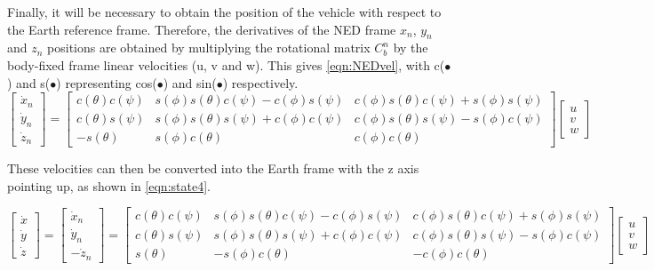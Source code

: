 Finally, it will be necessary to obtain the position of the vehicle with respect to the Earth reference frame. Therefore, the derivatives of the NED frame $x_{n}$, $y_{n}$ and $z_{n}$ positions are obtained by multiplying the rotational matrix $C^{n}_{b}$ by the body-fixed frame linear velocities (u, v and w). This gives \eqref{eqn:NEDvel}, with c($\bullet$) and s($\bullet$) representing cos($\bullet$) and sin($\bullet$) respectively. 
\begin{equation}\label{eqn:NEDvel}
\begin{bmatrix}
\dot{x}_{n}\\\dot{y}_{n}\\\dot{z}_{n}
\end{bmatrix}
=
\begin{bmatrix}
c(\theta)c(\psi) & s(\phi)s(\theta)c(\psi)-c(\phi)s(\psi) & c(\phi)s(\theta)c(\psi)+s(\phi)s(\psi)\\
c(\theta)s(\psi) & s(\phi)s(\theta)s(\psi)+c(\phi)c(\psi) & c(\phi)s(\theta)s(\psi)-s(\phi)c(\psi)\\
-s(\theta) & s(\phi)c(\theta) & c(\phi)c(\theta)
\end{bmatrix}
\begin{bmatrix}
u\\v\\w
\end{bmatrix}
\end{equation}

These velocities can then be converted into the Earth frame with the z axis pointing up, as shown in \eqref{eqn:state4}.
\begin{small}
\begin{equation}\label{eqn:state4}
\begin{bmatrix}
\dot{x}\\\dot{y}\\\dot{z}
\end{bmatrix}
=
\begin{bmatrix}
\dot{x}_{n}\\\dot{y}_{n}\\-\dot{z}_{n}
\end{bmatrix}
=
\begin{bmatrix}
c(\theta)c(\psi) & s(\phi)s(\theta)c(\psi)-c(\phi)s(\psi) & c(\phi)s(\theta)c(\psi)+s(\phi)s(\psi)\\
c(\theta)s(\psi) & s(\phi)s(\theta)s(\psi)+c(\phi)c(\psi) & c(\phi)s(\theta)s(\psi)-s(\phi)c(\psi)\\
s(\theta) & -s(\phi)c(\theta) & -c(\phi)c(\theta)
\end{bmatrix}
\begin{bmatrix}
u\\v\\w
\end{bmatrix}
\end{equation}
\end{small}

